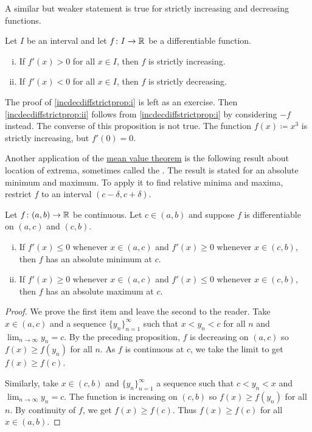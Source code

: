 A similar but weaker statement is true for strictly increasing and
decreasing functions.

\begin{prop} \label{incdecdiffstrictprop}
Let $I$ be an interval and
let $f \colon I \to {\mathbb{R}}$ be a differentiable function.
\begin{enumerate}[(i)]
\item
\label{incdecdiffstrictprop:i}
If $f'(x) > 0$ for all $x \in I$, then
$f$ is strictly increasing.
\item
\label{incdecdiffstrictprop:ii}
If $f'(x) < 0$ for all $x \in I$,
then $f$ is strictly decreasing.
\end{enumerate}
\end{prop}

The proof of
\ref{incdecdiffstrictprop:i}
is left as an exercise.
Then \ref{incdecdiffstrictprop:ii}
follows from 
\ref{incdecdiffstrictprop:i} by considering $-f$
instead.
The converse of this proposition is not true.  The function
$f(x) \coloneqq x^3$ is strictly increasing, but $f'(0) = 0$.

\medskip

Another application of the \hyperref[thm:mvt]{mean value theorem} is the following result about
location of extrema, sometimes called the
\emph{}.
The result is stated for an absolute minimum and maximum.
To apply it to find relative minima
and maxima, restrict $f$ to an interval $(c-\delta,c+\delta)$.

\begin{prop} \label{firstderminmaxtest}
Let $f \colon (a,b) \to {\mathbb{R}}$ be continuous.  Let $c \in (a,b)$
and suppose
$f$ is differentiable on $(a,c)$ and $(c,b)$.
\begin{enumerate}[(i)]
\item If $f'(x) \leq 0$ whenever $x \in (a,c)$ and
 $f'(x) \geq 0$ whenever $x \in (c,b)$, then $f$ has an absolute minimum 
at $c$.
\item If $f'(x) \geq 0$ whenever $x \in (a,c)$ and
 $f'(x) \leq 0$ whenever $x \in (c,b)$, then $f$ has an absolute maximum
at $c$.
\end{enumerate}
\end{prop}

\begin{proof}
We prove the first item and leave the second to the reader.
Take $x \in (a,c)$
and a sequence $\{ y_n\}_{n=1}^\infty$ such that $x < y_n < c$ for all $n$
and $\lim_{n\to\infty} y_n = c$.
By the preceding proposition,
$f$ is decreasing on $(a,c)$ so $f(x) \geq f(y_n)$ for all $n$.
As $f$ is
continuous at $c$, we take the limit to get
$f(x) \geq f(c)$.

Similarly, take $x \in (c,b)$
and $\{ y_n\}_{n=1}^\infty$ a sequence such that $c < y_n < x$ and
$\lim_{n\to\infty} y_n = c$.
The function is increasing on $(c,b)$ so $f(x) \geq f(y_n)$ for all $n$.
By continuity of $f$, we get
$f(x) \geq f(c)$.  Thus $f(x) \geq f(c)$ for all
$x \in (a,b)$.
\end{proof}

